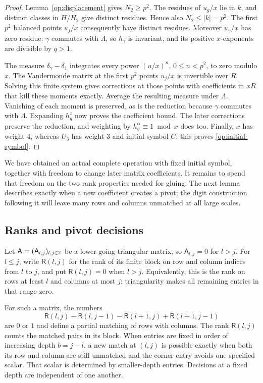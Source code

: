 \begin{proof}
Lemma~\ref{op:displacement} gives $N_2\ge p^2$. The residues of
$u_g/x$ lie in $k$, and distinct classes in $H/H_2$ give distinct
residues. Hence also $N_2\le|k|=p^2$. The first $p^2$ balanced points
$u_j/x$ consequently have distinct residues. Moreover $u_\gamma/x$
has zero residue: $\gamma$ commutes with $\Lambda$, so $h_\gamma$ is
invariant, and its positive $x$-exponents are divisible by $q>1$.

The measure $\delta_\gamma-\delta_1$ integrates every power
$(u/x)^n$, $0\le n<p^2$, to zero modulo $x$. The Vandermonde matrix
at the first $p^2$ points $u_j/x$ is invertible over $R$. Solving this
finite system gives corrections at those points with coefficients in
$xR$ that kill these moments exactly. Average the resulting measure
under $\Lambda$. Vanishing of each moment is preserved, as is the
reduction because $\gamma$ commutes with $\Lambda$. Expanding $h_g^z$
now proves the coefficient bound. The later corrections preserve the
reduction, and weighting by $h_g^\alpha\equiv1\bmod x$ does too.
Finally, $x$ has weight $4$, whereas $U_3$ has weight $3$ and initial
symbol $C$; this proves \eqref{op:initial-symbol}.
\end{proof}

We have obtained an actual complete operation with fixed initial
symbol, together with freedom to change later matrix coefficients.
It remains to spend that freedom on the two rank properties needed
for gluing. The next lemma describes exactly when a new coefficient
creates a pivot; the digit construction following it will leave
many rows and columns unmatched at all large scales.

\subsection{Ranks and pivot decisions}

Let $\mathsf A=(\mathsf A_{l,j})_{l,j\in\mathbb Z}$ be a lower-going
triangular matrix, so $\mathsf A_{l,j}=0$ for $l>j$. For $l\le j$,
write $\mathsf R(l,j)$ for
the rank of its finite block on row and column indices from $l$ to
$j$, and put $\mathsf R(l,j)=0$ when $l>j$. Equivalently, this is
the rank on rows at least $l$ and columns at most $j$: triangularity
makes all remaining entries in that range zero.

\begin{lemma}
\label{op:matching}
For such a matrix, the numbers
\begin{equation}
 \mathsf R(l,j)-\mathsf R(l,j-1)-\mathsf R(l+1,j)
                       +\mathsf R(l+1,j-1)
 \label{op:rank-matching}
\end{equation}
are $0$ or $1$ and define a partial matching of rows with columns.
The rank $\mathsf R(l,j)$ counts the matched pairs in its block.
When entries are fixed in order of increasing depth $b=j-l$, a new
match at $(l,j)$ is possible exactly when both its row and column
are still unmatched and the corner entry avoids one specified scalar.
That scalar is determined by smaller-depth entries. Decisions at a
fixed depth are independent of one another.
\end{lemma}


